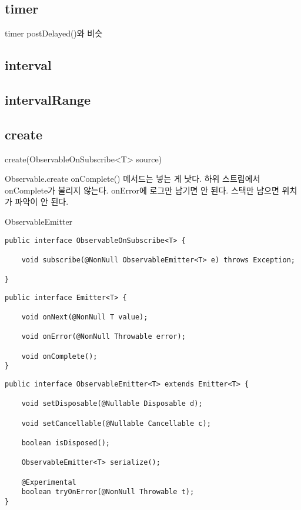 \documentclass{book}
\begin{document}
\subsection{timer}
timer postDelayed()와 비슷

\subsection{interval}

\subsection{intervalRange}



\subsection{create}
create(ObservableOnSubscribe<T> source)

Observable.create
onComplete() 메서드는 넣는 게 낫다. 
하위 스트림에서 onComplete가 불리지 않는다.
onError에 로그만 남기면 안 된다. 스택만 남으면 위치가 파악이 안 된다. 

ObservableEmitter

\begin{verbatim}
public interface ObservableOnSubscribe<T> {

    void subscribe(@NonNull ObservableEmitter<T> e) throws Exception;
    
}
\end{verbatim}

\begin{verbatim}
public interface Emitter<T> {

    void onNext(@NonNull T value);

    void onError(@NonNull Throwable error);

    void onComplete();
}
\end{verbatim}

\begin{verbatim}
public interface ObservableEmitter<T> extends Emitter<T> {

    void setDisposable(@Nullable Disposable d);

    void setCancellable(@Nullable Cancellable c);

    boolean isDisposed();

    ObservableEmitter<T> serialize();

    @Experimental
    boolean tryOnError(@NonNull Throwable t);
}
\end{verbatim}
\end{document}
